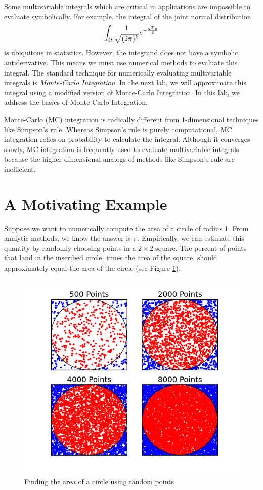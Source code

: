 
Some multivariable integrals which are critical in applications are impossible to evaluate symbolically.
For example, the integral of the joint normal distribution
\[
\int_{\Omega} \frac{1}{\sqrt{(2 \pi)^k}} e^{- \frac{\bold{x}^T\bold{x}}{2}}
\]
is ubiquitous in statistics.
However, the integrand does not have a symbolic antiderivative.
This means we must use numerical methods to evaluate this integral. The standard technique for numerically evaluating multivariable integrals is \emph{Monte-Carlo Integration}. In the next lab, we will approximate this integral using a modified version of Monte-Carlo Integration. In this lab, we address the basics of Monte-Carlo Integration.

Monte-Carlo (MC) integration is radically different from 1-dimensional techniques like Simpson's rule. Whereas Simpson's rule is purely computational, MC integration relies on probability to calculate the integral.
Although it converges slowly, MC integration is frequently used to evaluate multivariable integrals because the higher-dimensional analogs of methods like Simpson's rule are inefficient.

\section*{A Motivating Example}
Suppose we want to numerically compute the area of a circle of radius 1.
From analytic methods, we know the answer is $\pi$.
Empirically, we can estimate this quantity by randomly choosing points in a $2 \times 2$ square.
The percent of points that land in the inscribed circle, times the area of the square, should approximately equal the area of the circle (see Figure \ref{fig:MCCircle}).

\begin{figure}
\includegraphics[width=.7\textwidth]{MC.png}
\caption{Finding the area of a circle using random points}
\label{fig:MCCircle}
\end{figure}

